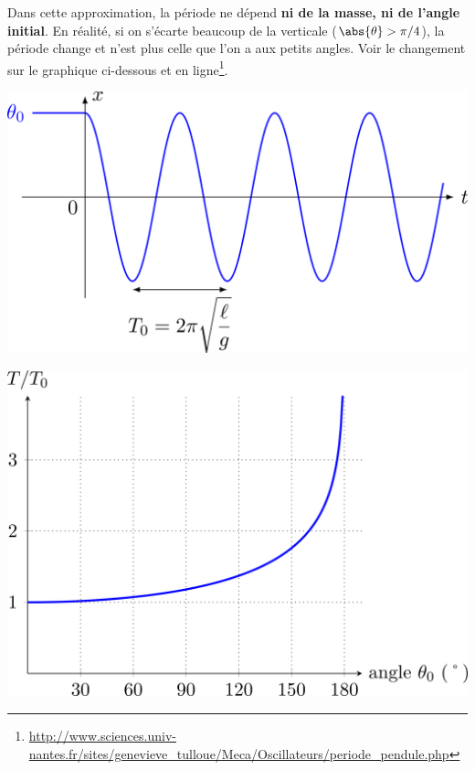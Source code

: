 \documentclass[../../main/main.tex]{subfiles}
\begin{document}
Dans cette approximation, la période ne dépend \textbf{ni de la masse, ni de
	l'angle initial}. En réalité, si on s'écarte beaucoup de la verticale
($\abs{\theta} > \pi/4$), la période change et n'est plus celle que l'on a aux
petits angles. Voir le changement sur le graphique ci-dessous et en
ligne\footnote{\url{http://www.sciences.univ-nantes.fr/sites/genevieve_tulloue/Meca/Oscillateurs/periode_pendule.php}}.

\begin{minipage}{0.45\linewidth}
	\begin{center}
		\includegraphics[width=\linewidth]{pendule_sol}
	\end{center}
\end{minipage}
\hfill
\begin{minipage}{0.45\linewidth}
	\begin{center}
		\includegraphics[width=\linewidth]{pendule_gdang}
	\end{center}
\end{minipage}
\end{document}
